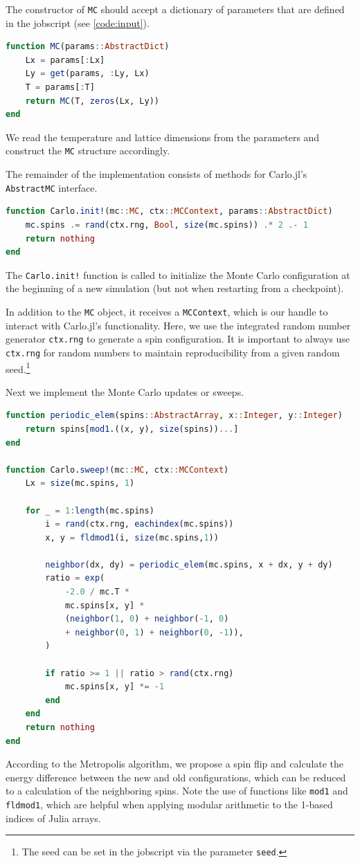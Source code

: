 \documentclass{SciPost}
\begin{document}
The constructor of \texttt{MC} should accept a dictionary of parameters that are defined in the jobscript (see \cref{code:input}).
\begin{lstlisting}[language=julia]
function MC(params::AbstractDict)
    Lx = params[:Lx]
    Ly = get(params, :Ly, Lx)
    T = params[:T]
    return MC(T, zeros(Lx, Ly))
end
\end{lstlisting}
We read the temperature and lattice dimensions from the parameters and construct the \texttt{MC} structure accordingly.

The remainder of the implementation consists of methods for Carlo.jl's \texttt{AbstractMC} interface.

\begin{lstlisting}[language=julia]
function Carlo.init!(mc::MC, ctx::MCContext, params::AbstractDict)
    mc.spins .= rand(ctx.rng, Bool, size(mc.spins)) .* 2 .- 1
    return nothing
end
\end{lstlisting}
The \texttt{Carlo.init!} function is called to initialize the Monte Carlo configuration at the beginning of a new simulation (but not when restarting from a checkpoint).

In addition to the \texttt{MC} object, it receives a \texttt{MCContext}, which is our handle to interact with Carlo.jl's functionality. Here, we use the integrated random number generator \texttt{ctx.rng} to generate a spin configuration. It is important to always use \texttt{ctx.rng} for random numbers to maintain reproducibility from a given random seed.\footnote{The seed can be set in the jobscript via the parameter \texttt{seed}.}

Next we implement the Monte Carlo updates or sweeps.
\begin{lstlisting}[language=julia]
function periodic_elem(spins::AbstractArray, x::Integer, y::Integer)
    return spins[mod1.((x, y), size(spins))...]
end

function Carlo.sweep!(mc::MC, ctx::MCContext)
    Lx = size(mc.spins, 1)

    for _ = 1:length(mc.spins)
        i = rand(ctx.rng, eachindex(mc.spins))
        x, y = fldmod1(i, size(mc.spins,1))

        neighbor(dx, dy) = periodic_elem(mc.spins, x + dx, y + dy)
        ratio = exp(
            -2.0 / mc.T *
            mc.spins[x, y] *
            (neighbor(1, 0) + neighbor(-1, 0)
            + neighbor(0, 1) + neighbor(0, -1)),
        )

        if ratio >= 1 || ratio > rand(ctx.rng)
            mc.spins[x, y] *= -1
        end
    end
    return nothing
end
\end{lstlisting}
According to the Metropolis algorithm, we propose a spin flip and calculate the energy difference between the new and old configurations, which can be reduced to a calculation of the neighboring spins. Note the use of functions like \texttt{mod1} and \texttt{fldmod1}, which are helpful when applying modular arithmetic to the 1-based indices of Julia arrays.
\end{document}
